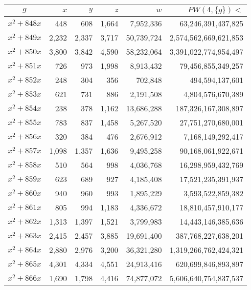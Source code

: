 \documentclass{article}
\begin{document}
\begin{center}
\begin{tabular}{ | c | r | r | r | r | r | }
$g$ & $x$ & $y$ & $z$ & $w$ & $PW(4, \{g\}) <$ \\ \hline
$x^2 + 848x$ & 448 & 608 & 1{,}664 & 7{,}952{,}336 & 63{,}246{,}391{,}437{,}825 \\ \hline
$x^2 + 849x$ & 2{,}232 & 2{,}337 & 3{,}717 & 50{,}739{,}724 & 2{,}574{,}562{,}669{,}621{,}853 \\ \hline
$x^2 + 850x$ & 3{,}800 & 3{,}842 & 4{,}590 & 58{,}232{,}064 & 3{,}391{,}022{,}774{,}954{,}497 \\ \hline
$x^2 + 851x$ & 726 & 973 & 1{,}998 & 8{,}913{,}432 & 79{,}456{,}855{,}349{,}257 \\ \hline
$x^2 + 852x$ & 248 & 304 & 356 & 702{,}848 & 494{,}594{,}137{,}601 \\ \hline
$x^2 + 853x$ & 621 & 731 & 886 & 2{,}191{,}508 & 4{,}804{,}576{,}670{,}389 \\ \hline
$x^2 + 854x$ & 238 & 378 & 1{,}162 & 13{,}686{,}288 & 187{,}326{,}167{,}308{,}897 \\ \hline
$x^2 + 855x$ & 783 & 837 & 1{,}458 & 5{,}267{,}520 & 27{,}751{,}270{,}680{,}001 \\ \hline
$x^2 + 856x$ & 320 & 384 & 476 & 2{,}676{,}912 & 7{,}168{,}149{,}292{,}417 \\ \hline
$x^2 + 857x$ & 1{,}098 & 1{,}357 & 1{,}636 & 9{,}495{,}258 & 90{,}168{,}061{,}922{,}671 \\ \hline
$x^2 + 858x$ & 510 & 564 & 998 & 4{,}036{,}768 & 16{,}298{,}959{,}432{,}769 \\ \hline
$x^2 + 859x$ & 623 & 689 & 927 & 4{,}185{,}408 & 17{,}521{,}235{,}391{,}937 \\ \hline
$x^2 + 860x$ & 940 & 960 & 993 & 1{,}895{,}229 & 3{,}593{,}522{,}859{,}382 \\ \hline
$x^2 + 861x$ & 805 & 994 & 1{,}183 & 4{,}336{,}672 & 18{,}810{,}457{,}910{,}177 \\ \hline
$x^2 + 862x$ & 1{,}313 & 1{,}397 & 1{,}521 & 3{,}799{,}983 & 14{,}443{,}146{,}385{,}636 \\ \hline
$x^2 + 863x$ & 2{,}415 & 2{,}457 & 3{,}885 & 19{,}691{,}400 & 387{,}768{,}227{,}638{,}201 \\ \hline
$x^2 + 864x$ & 2{,}880 & 2{,}976 & 3{,}200 & 36{,}321{,}280 & 1{,}319{,}266{,}762{,}424{,}321 \\ \hline
$x^2 + 865x$ & 4{,}301 & 4{,}334 & 4{,}551 & 24{,}913{,}416 & 620{,}699{,}846{,}893{,}897 \\ \hline
$x^2 + 866x$ & 1{,}690 & 1{,}798 & 4{,}416 & 74{,}877{,}072 & 5{,}606{,}640{,}754{,}837{,}537 \\ \hline

\end{tabular}
\end{center}
\end{document}
